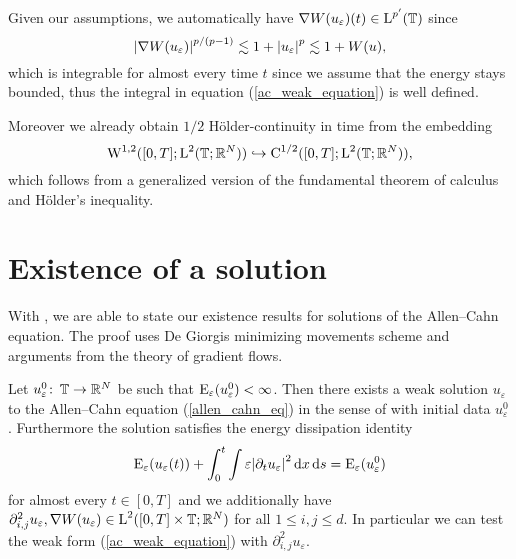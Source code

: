 \begin{remark}
	Given our assumptions, we automatically have $ \nabla W ( u_{ \varepsilon } ) ( t ) \in \operatorname{L}^{ p' } ( \operatorname{\mathbb{T}} ) $ since
	\begin{equation}
		\abs{ \nabla W ( u_{ \varepsilon} ) }^{ p/(p-1) }
		\lesssim
		1+ \abs{u_{ \varepsilon }}^{ p }
		\lesssim
		1 + W ( u ),
	\end{equation}
	which is integrable for almost every time $ t $ since we assume that the energy stays bounded,
	thus the integral in equation (\ref{ac_weak_equation}) is well defined.
	
	Moreover we already obtain $ 1/2 $ Hölder-continuity in time from the embedding
	\begin{equation}
		\operatorname{W}^{ 1 , 2} ( [ 0 , T ] ; \operatorname{L}^{ 2 } ( \operatorname{\mathbb{T}};\mathbb{ R }^{ N } ) )
		\hookrightarrow
		\operatorname{C}^{ 1/2 } ( [ 0 , T ] ; \operatorname{L}^{ 2 } ( \operatorname{\mathbb{T}} ; \mathbb{ R }^{ N } ) ),
	\end{equation}
	which follows from a generalized version of the fundamental theorem of calculus and Hölder's inequality.
\end{remark}

\section{Existence of a solution}

With , we are able to state our existence results for solutions of the Allen--Cahn equation. The proof uses De Giorgis minimizing movements scheme and arguments from the theory of gradient flows.

\begin{theorem}
	\label{existence_of_ac_solution}
	Let $ u_{ \varepsilon}^{ 0 } \colon \operatorname{\mathbb{T}} \to \mathbb{ R }^{ N } $ be such that 
	$ \operatorname{E}_{ \varepsilon } ( u_{ \varepsilon}^{ 0 } ) < \infty $.
	Then there exists a weak solution $ u_{ \varepsilon} $ to the Allen--Cahn equation (\ref{allen_cahn_eq}) in the sense of  with initial data $ u_{ \varepsilon}^{ 0 } $.
	Furthermore the solution satisfies the energy dissipation identity
	\begin{equation}
		\operatorname{E}_{ \varepsilon } ( u_{ \varepsilon } ( t ) )
		+
		\int_{ 0 }^{ t }
			\int
				\varepsilon \abs{ \partial_{ t } u_{ \varepsilon } }^{ 2 }
			\dd{ x }
		\dd{ s }
		=
		\operatorname{E}_{ \varepsilon } ( u_{ \varepsilon}^{ 0 } )
	\end{equation}
	for almost every $ t \in [ 0 , T ] $ and we additionally have
	$
		\partial_{ i , j }^{ 2 } u_{ \varepsilon }, \nabla W ( u_{ \varepsilon } ) \in \operatorname{L}^{ 2 } ( [0, T] \times \operatorname{\mathbb{T}} ; \mathbb{ R }^{ N } ) 
	$
	for all $ 1 \leq i, j \leq d $. In particular we can test the weak form (\ref{ac_weak_equation}) with $ \partial_{ i , j }^{ 2 } u_{ \varepsilon } $.
\end{theorem}

